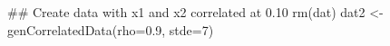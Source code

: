 \begin{Schunk}
\begin{Sinput}
 ## Create data with x1 and x2 correlated at 0.10
 rm(dat)
 dat2 <- genCorrelatedData(rho=0.9, stde=7)
\end{Sinput}
\end{Schunk}
